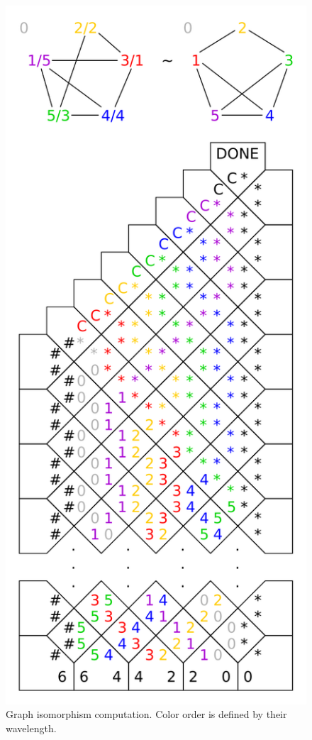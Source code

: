 \begin{figure}[H]
\begin{center}
	\includegraphics[scale=0.75]{./figures/isomorphism/isomorphism.pdf}
	\caption{Graph isomorphism computation. Color order is defined by their wavelength.}
	\label{fig:graph_iso}
\end{center}
\end{figure}
